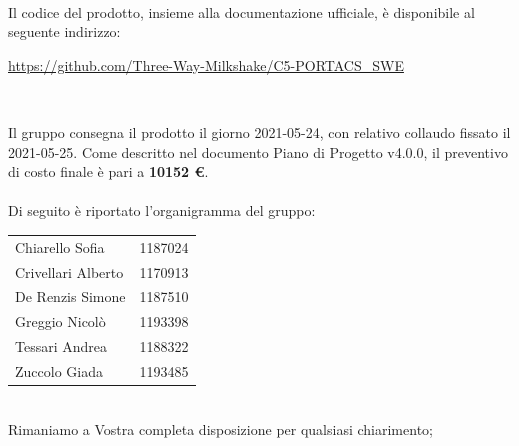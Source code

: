 \documentclass[10pt,stdletter,dateno,sigright]{newlfm}  %
\begin{document}
\begin{newlfm}
        \ \\
        Il codice del prodotto, insieme alla documentazione ufficiale, è disponibile al seguente indirizzo:
		\begin{center}
			\url{https://github.com/Three-Way-Milkshake/C5-PORTACS_SWE}
		\end{center}
		\

         Il gruppo consegna il prodotto il giorno 2021-05-24, con relativo collaudo fissato il 2021-05-25.
         Come descritto nel documento {Piano di Progetto v4.0.0}, il preventivo di costo finale è pari a \textbf{10152 \euro}.
        \\
        \\

        Di seguito \`e riportato l'organigramma del gruppo:
        \begin{center}
            \begin{tabular}{l | l}
                Chiarello Sofia & 1187024
                \\
                Crivellari Alberto & 1170913
                \\
                De Renzis Simone & 1187510
                \\
                Greggio Nicolò & 1193398
                \\
                Tessari Andrea & 1188322
                \\
                Zuccolo Giada & 1193485
                \\
            \end{tabular}
        \end{center}
        \ \newline
        \\Rimaniamo a Vostra completa disposizione per qualsiasi chiarimento;

    \end{newlfm}
\end{document}
